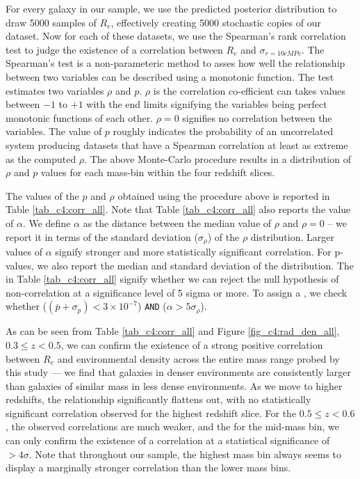 For every galaxy in our sample, we use the predicted posterior distribution to draw 5000 samples of $R_e$, effectively creating 5000 stochastic copies of our dataset. Now for each of these datasets, we use the Spearman's rank correlation test \citep{spearman_original} to judge the existence of a correlation between $R_e$ and $\sigma_{r=10cMPc}$. The Spearman's test is a non-parameteric method to asses how well the relationship between two variables can be described using a monotonic function. The test estimates two variables $\rho$ and $p$. $\rho$ is the correlation co-efficient can takes values between $-1$ to $+1$ with the end limits signifying the variables being perfect monotonic functions of each other. $\rho=0$ signifies no correlation between the variables. The value of $p$ roughly indicates the probability of an uncorrelated system producing datasets that have a Spearman correlation at least as extreme as the computed $\rho$. The above Monte-Carlo procedure results in a distribution of $\rho$ and $p$ values for each mass-bin within the four redshift slices. %

The values of the $p$ and $\rho$ obtained using the procedure above is reported in Table \ref{tab_c4:corr_all}. Note that Table \ref{tab_c4:corr_all} also reports the value of $\alpha$. We define $\alpha$ as the distance between the median value of $\rho$ and $\rho=0$ -- we report it in terms of the standard deviation ($\sigma_{\rho}$) of the $\rho$ distribution. Larger values of $\alpha$ signify stronger and more statistically significant correlation. For p-values, we also report the median and standard deviation of the distribution. The  in Table \ref{tab_c4:corr_all} signify whether we can reject the null hypothesis of non-correlation at a significance level of 5 sigma or more. To assign a \checkmark, we check whether ($(\overline{p} + \sigma_p) < 3\times10^{-7} $) \texttt{AND} ($\alpha>5\sigma_{\rho}$). 

As can be seen from Table \ref{tab_c4:corr_all} and Figure \ref{fig_c4:rad_den_all}, $0.3 \leq z < 0.5$, we can confirm the existence of a strong positive correlation between $R_e$ and environmental density across the entire mass range probed by this study ---  we find that galaxies in denser environments are consistently larger than galaxies of similar mass in less dense environments. As we move to higher redshifts, the relationship significantly flattens out, with no statistically significant correlation observed for the highest redshift slice. For the $0.5 \leq z < 0.6$, the observed correlations are much weaker, and the for the mid-mass bin, we can only confirm the existence of a correlation at a statistical significance of $>4\sigma$. Note that throughout our sample, the highest mass bin always seems to display a marginally stronger correlation than the lower mass bins. 

